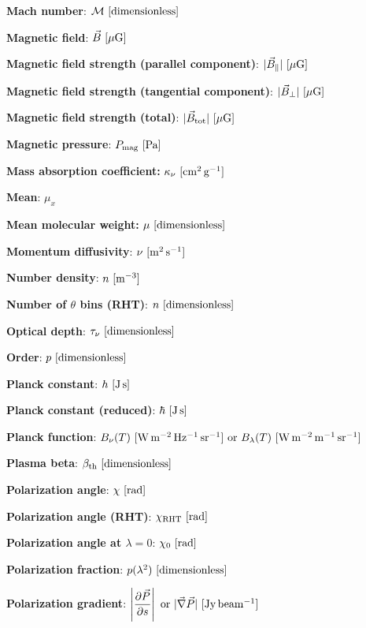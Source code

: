 \documentclass[a4paper,10pt]{article}
\begin{document}
{\noindent}\textbf{Mach number}: $\mathcal{M}~[{\rm dimensionless]}$

{\noindent}\textbf{Magnetic field}: $\vec{B}~[{\rm \mu G]}$

{\noindent}\textbf{Magnetic field strength (parallel component)}: $\lvert\vec{B}_\parallel\rvert~[{\rm \mu G]}$

{\noindent}\textbf{Magnetic field strength (tangential component)}: $\lvert\vec{B}_\perp\rvert~[{\rm \mu G]}$

{\noindent}\textbf{Magnetic field strength (total)}: $\lvert\vec{B}_{\rm tot}\rvert~[{\rm \mu G]}$

{\noindent}\textbf{Magnetic pressure}: $P_{\rm mag} ~ [{\rm Pa]}$

{\noindent}\textbf{Mass absorption coefficient:} $\kappa_\nu ~ [{\rm cm^2\,g^{-1}}]$

{\noindent}\textbf{Mean}: $\mu_x$

{\noindent}\textbf{Mean molecular weight:} $\mu ~ [{\rm dimensionless}]$

{\noindent}\textbf{Momentum diffusivity}: $\nu ~ [{\rm m^2\,s^{-1}}]$

{\noindent}\textbf{Number density}: $n ~ [{\rm m^{-3}}]$

{\noindent}\textbf{Number of $\theta$ bins (RHT)}: $n ~ [{\rm dimensionless}]$

{\noindent}\textbf{Optical depth}: $\tau_\nu~[{\rm dimensionless}]$

{\noindent}\textbf{Order}: $p~[{\rm dimensionless}]$

{\noindent}\textbf{Planck constant}: $h~[{\rm J\,s}]$

{\noindent}\textbf{Planck constant (reduced)}: $\hbar~[{\rm J\,s}]$

{\noindent}\textbf{Planck function}: $B_\nu(T)~[{\rm W\,m^{-2}\,Hz^{-1}\,sr^{-1}}]~{\rm or}~B_\lambda(T)~[{\rm W\,m^{-2}\,m^{-1}\,sr^{-1}}]$

{\noindent}\textbf{Plasma beta}: $\beta_{\rm th} ~ [{\rm dimensionless}]$

{\noindent}\textbf{Polarization angle}: $\chi~[{\rm rad}]$

{\noindent}\textbf{Polarization angle (RHT)}: $\chi_\mathrm{RHT} ~ [{\rm rad}]$

{\noindent}\textbf{Polarization angle at $\lambda=0$}: $\chi_0~[{\rm rad}]$

{\noindent}\textbf{Polarization fraction}: $p(\lambda^2)~[{\rm dimensionless}]$

{\noindent}\textbf{Polarization gradient}: $\left\lvert\dfrac{\partial\vec{P}}{\partial s}\right\rvert~{\rm or}~\lvert\vec\nabla\vec{P}\rvert ~ [\rm Jy\,beam^{-1}]$
\end{document}

